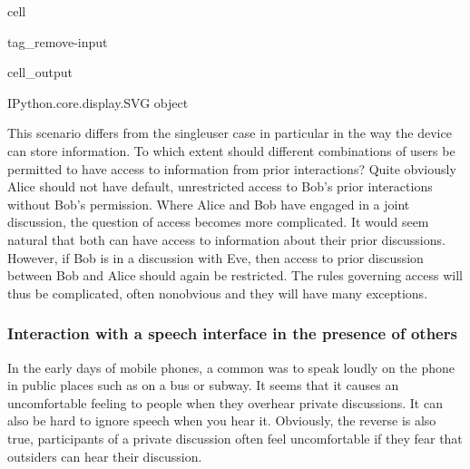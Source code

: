 \documentclass[letterpaper,10pt,english]{jupyterBook}
\begin{document}
\begin{sphinxuseclass}{cell}
\begin{sphinxuseclass}{tag_remove-input}\begin{sphinxVerbatimOutput}

\begin{sphinxuseclass}{cell_output}
\begin{sphinxVerbatim}[commandchars=\\\{\}]
\PYGZlt{}IPython.core.display.SVG object\PYGZgt{}
\end{sphinxVerbatim}

\end{sphinxuseclass}\end{sphinxVerbatimOutput}

\end{sphinxuseclass}
\end{sphinxuseclass}
\sphinxAtStartPar
This scenario differs from the single\sphinxhyphen{}user case in particular in the way the device can store information. To which extent should different combinations of users be permitted to have access to information from prior interactions? Quite obviously Alice should not have default, unrestricted access to Bob’s prior interactions without Bob’s permission. Where Alice and Bob have engaged in a joint discussion, the question of access becomes more complicated. It would seem natural that both can have access to information about their prior discussions. However, if Bob is in a discussion with Eve, then access to prior discussion between Bob and Alice should again be restricted. The rules governing access will thus be complicated, often non\sphinxhyphen{}obvious and they will have many exceptions.


\subsubsection{Interaction with a speech interface in the presence of others}
\label{\detokenize{Security_and_privacy:interaction-with-a-speech-interface-in-the-presence-of-others}}
\sphinxAtStartPar
In the early days of mobile phones, a common  was to speak loudly on the phone in public places such as on a bus or subway. It seems that it causes an uncomfortable feeling to people when they overhear private discussions. It can also be hard to ignore speech when you hear it.
Obviously, the reverse is also true, participants of a private discussion often feel uncomfortable if they fear that outsiders can hear their discussion.
\end{document}
